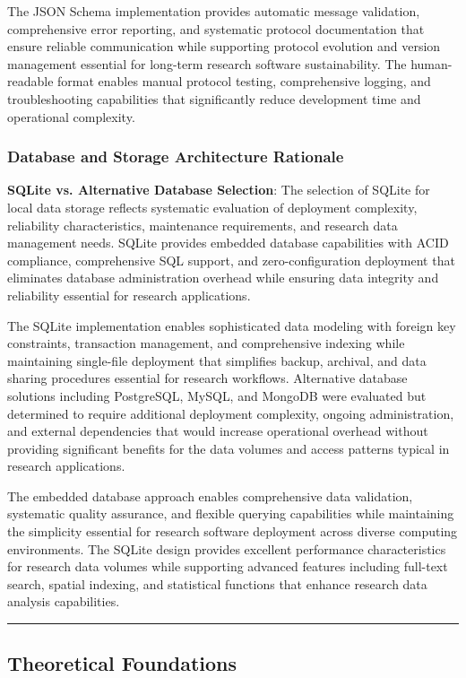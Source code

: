 \documentclass[11pt,a4paper]{report}
\begin{document}
The JSON Schema implementation provides automatic message validation, comprehensive error reporting, and systematic
protocol documentation that ensure reliable communication while supporting protocol evolution and version management
essential for long-term research software sustainability. The human-readable format enables manual protocol testing,
comprehensive logging, and troubleshooting capabilities that significantly reduce development time and operational
complexity.

\subsubsection{Database and Storage Architecture Rationale}

\textbf{SQLite vs. Alternative Database Selection}: The selection of SQLite for local data storage reflects systematic
evaluation of deployment complexity, reliability characteristics, maintenance requirements, and research data management
needs. SQLite provides embedded database capabilities with ACID compliance, comprehensive SQL support, and
zero-configuration deployment that eliminates database administration overhead while ensuring data integrity and
reliability essential for research applications.

The SQLite implementation enables sophisticated data modeling with foreign key constraints, transaction management, and
comprehensive indexing while maintaining single-file deployment that simplifies backup, archival, and data sharing
procedures essential for research workflows. Alternative database solutions including PostgreSQL, MySQL, and MongoDB
were evaluated but determined to require additional deployment complexity, ongoing administration, and external
dependencies that would increase operational overhead without providing significant benefits for the data volumes and
access patterns typical in research applications.

The embedded database approach enables comprehensive data validation, systematic quality assurance, and flexible
querying capabilities while maintaining the simplicity essential for research software deployment across diverse
computing environments. The SQLite design provides excellent performance characteristics for research data volumes while
supporting advanced features including full-text search, spatial indexing, and statistical functions that enhance
research data analysis capabilities.

\hrule

\subsection{Theoretical Foundations}
\end{document}
